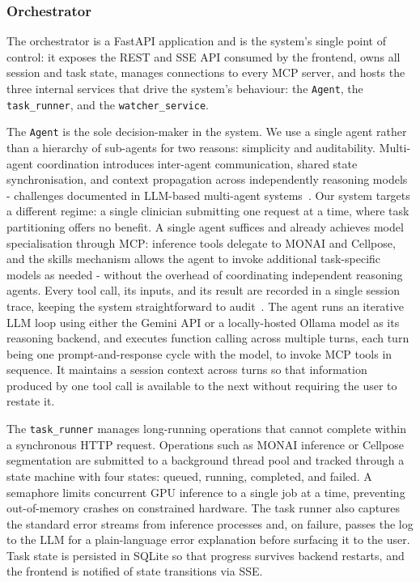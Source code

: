 \documentclass[conference]{IEEEtran}
\begin{document}
\subsubsection*{Orchestrator}
The orchestrator is a FastAPI application and is the system's single
point of control: it exposes the REST and SSE API consumed by the
frontend, owns all session and task state, manages connections to every
MCP server, and hosts the three internal services that drive the
system's behaviour: the \texttt{Agent}, the
\texttt{task\_runner}, and the \texttt{watcher\_service}.

The \texttt{Agent} is the sole decision-maker in the system.
We use a single agent rather than a hierarchy of sub-agents for two reasons: simplicity and auditability.
Multi-agent coordination introduces inter-agent communication, shared state synchronisation, and context propagation across independently reasoning models - challenges documented in LLM-based multi-agent systems~\cite{guo2024llmma}. Our system targets a different regime: a single clinician submitting one request at a time, where task partitioning offers no benefit. A single agent suffices and already achieves model specialisation through MCP: inference tools delegate to MONAI and Cellpose, and the skills mechanism allows the agent to invoke additional task-specific models as needed - without the overhead of coordinating independent reasoning agents. Every tool call, its inputs, and its result are recorded in a single session trace, keeping the system straightforward to audit~\cite{collaco2026scoping}.
The agent runs an iterative LLM loop
using either the Gemini API or a locally-hosted Ollama model as its
reasoning backend, and executes function calling across multiple turns, each turn being one prompt-and-response cycle with the model, to invoke
MCP tools in sequence. It maintains a session context across turns so
that information produced by one tool call is available to the next
without requiring the user to restate it.

The \texttt{task\_runner} manages long-running operations that cannot
complete within a synchronous HTTP request. Operations such as MONAI
inference or Cellpose segmentation are submitted to a background thread
pool and tracked through a state machine with four states: queued,
running, completed, and failed.
A semaphore limits concurrent GPU
inference to a single job at a time, preventing out-of-memory crashes
on constrained hardware.
The task runner also captures the standard error streams
from inference processes and, on failure, passes the log to the LLM
for a plain-language error explanation before surfacing it to the user.
Task state is persisted in SQLite so that progress survives backend
restarts, and the frontend is notified of state transitions via SSE\@.
\end{document}
